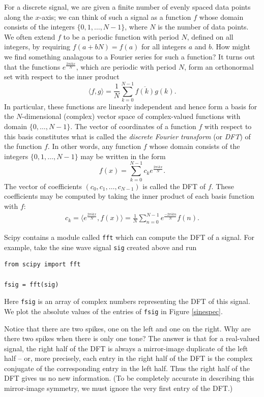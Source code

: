 For a discrete signal, we are given a finite number of evenly spaced data points along the $x$-axis; we can think of such a signal as a function $f$ whose domain consists of the integers $\{0,1,\dots,N-1\}$, where $N$ is the number of data points. 
We often extend $f$ to be a periodic function with period $N$, defined on all integers, by requiring $f(a+bN)=f(a)$ for all integers $a$ and $b$.
How might we find something analagous to a Fourier series for such a function?
It turns out that the functions $e^{\frac{2\pi ikx}N}$, which are periodic with period $N$, form an orthonormal set with respect to the inner product
\[
\langle f,g\rangle = \frac1N\sum_{k=0}^{N-1}\overline{f(k)}g(k).
\]
In particular, these functions are linearly independent and hence form a basis for the $N$-dimensional (complex) vector space of complex-valued functions with domain $\{0,\dots,N-1\}$.
The vector of coordinates of a function $f$ with respect to this basis constitutes what is called the \emph{discrete Fourier transform} (or \emph{DFT}) of the function $f$.
In other words, any function $f$ whose domain consists of the integers $\{0,1,\dots,N-1\}$ may be written in the form
\[
f(x)=\sum_{k=0}^{N-1}c_ke^{\frac{2\pi ikx}N}.
\]
The vector of coefficients $(c_0,c_1,\dots,c_{N-1})$ is called the DFT of $f$. These coefficients may be computed by taking the inner product of each basis function with $f$:
\begin{align}
	c_k=\langle e^{\frac{2\pi ikx}N}, f(x)\rangle=\frac1N\sum_{n=0}^{N-1}e^{\frac{-2\pi ikn}N}f(n) . \label{transform_coefficients}
\end{align}


Scipy contains a module called \texttt{fft} which can compute the DFT of a signal.
For example, take the sine wave signal \texttt{sig} created above and run
\begin{lstlisting}
from scipy import fft

fsig = fft(sig)
\end{lstlisting}
Here \texttt{fsig} is an array of complex numbers representing the DFT of this signal. We plot the absolute values of the entries of \texttt{fsig} in Figure \ref{sinespec}.


Notice that there are two spikes, one on the left and one on the right.
Why are there two spikes when there is only one tone?
The answer is that for a real-valued signal, the right half of the DFT is always a mirror-image duplicate of the left half -- or, more precisely, each entry in the right half of the DFT is the complex conjugate of the corresponding entry in the left half.
Thus the right half of the DFT gives us no new information.
(To be completely accurate in describing this mirror-image symmetry, we must ignore the very first entry of the DFT.)



